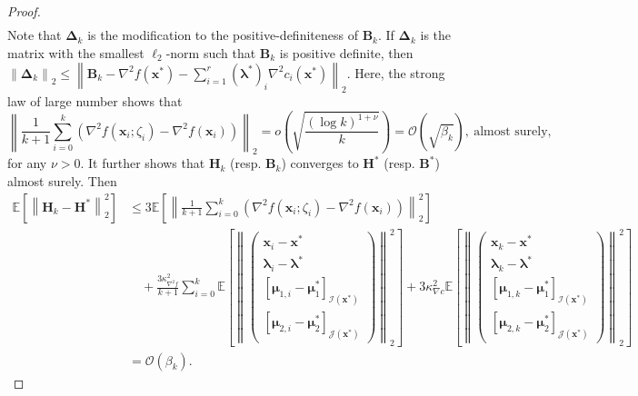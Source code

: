 \documentclass[aos]{imsart}
\numberwithin{equation}{section}
\theoremstyle{plain}
\begin{document}
\begin{appendix}
\begin{proof}
\begin{equation}
\begin{split}
        \end{split}
    \end{equation}
    Note that $\bm{\Delta}_k$ is the modification to the positive-definiteness of $\bm{B}_k$. If $\bm{\Delta}_k$ is the matrix with the smallest $\ell_2$-norm such that $\bm{B}_k$ is positive definite, then $\left\|\bm{\Delta}_k \right\|_2 \leq \left\| \bm{B}_k - \nabla^2 f(\bm{x}^{*}) - \sum_{i=1}^{r} (\bm{\lambda}^{*})_{i} \nabla^2 c_i(\bm{x}^{*}) \right\|_2$.
    Here, the strong law of large number shows that 
    \begin{equation}
    \label{eq31}
        \left\| \frac{1}{k+1} \sum_{i=0}^{k} \left( \nabla^2 f(\bm{x}_i;\zeta_i) - \nabla^2 f(\bm{x}_i )\right) \right\|_2 = o\left( \sqrt{\frac{\left( \log k \right)^{1+\nu}}{k}} \right) = \mathcal{O}\left(\sqrt{ \beta_k} \right), ~\text{almost surely},
    \end{equation}
    for any $\nu > 0$.
    It further shows that $\bm{H}_k$ (resp. $\bm{B}_k$) converges to $\bm{H}^{*}$ (resp. $\bm{B}^{*}$) almost surely.
    Then
    \begin{equation*}
        \begin{split}
            \mathbb{E} \left[  \left\| \bm{H}_k - \bm{H}^{*}\right\|_2^2 \right] & \leq 3 \mathbb{E} \left[  \left\| \frac{1}{k +1} \sum_{i=0}^{k} \left( \nabla^2 f(\bm{x}_i;\zeta_i) - \nabla^2 f(\bm{x}_i )\right) \right\|_2^2 \right] \\
            & \hspace{1em} + \frac{3\kappa_{\nabla^2 f}^2}{k +1} \sum_{i=0}^{k} \mathbb{E} \left[ \left\|  \left( \begin{array}{c}
    \bm{x}_{i} - \bm{x}^{*}  \\
    \bm{\lambda}_{i} - \bm{\lambda}^{*} \\
    \left[ \bm{\mu}_{1,i} - \bm{\mu}_{1}^{*}\right]_{\mathcal{I}(\bm{x}^{*})} \\
    \left[ \bm{\mu}_{2,i} - \bm{\mu}_{2}^{*} \right]_{\mathcal{J}(\bm{x}^{*})} 
    \end{array} \right)  \right\|_2^2 \right]  + 3 \kappa_{\nabla c}^2 \mathbb{E} \left[\left\|  \left( \begin{array}{c}
    \bm{x}_{k} - \bm{x}^{*}  \\
    \bm{\lambda}_{k} - \bm{\lambda}^{*} \\
    \left[ \bm{\mu}_{1,k} - \bm{\mu}_{1}^{*}\right]_{\mathcal{I}(\bm{x}^{*})} \\
    \left[ \bm{\mu}_{2,k} - \bm{\mu}_{2}^{*} \right]_{\mathcal{J}(\bm{x}^{*})} 
    \end{array} \right)  \right\|_2^2   \right] \\
    & = \mathcal{O}\left( \beta_k \right).
        \end{split}
    \end{equation*}
\end{proof}



\end{appendix}
\end{document}
